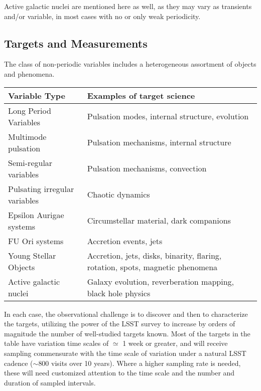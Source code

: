 Active galactic nuclei are mentioned here as well, as they may vary as transients and/or variable, in most cases with no or only weak periodicity.


\subsection{Targets and Measurements}
\label{sec:\secname:targets}

The class of non-periodic variables includes a heterogeneous
assortment of objects and phenomena.

\begin{center}
\begin{tabular}{| p{5cm} | p{10cm} |}
\hline Variable Type & Examples of target science\\
\hline
Long Period Variables & Pulsation modes, internal structure, evolution\\
Multimode pulsation & Pulsation mechanisms, internal structure\\
Semi-regular variables & Pulsation mechanisms, convection \\
Pulsating irregular variables & Chaotic dynamics \\
Epsilon Aurigae systems & Circumstellar material, dark companions\\
FU Ori systems & Accretion events, jets\\
Young Stellar Objects & Accretion, jets, disks, binarity, flaring, rotation, spots, magnetic phenomena\\
Active galactic nuclei & Galaxy evolution, reverberation mapping, black hole physics\\
 \hline \end{tabular}
 \end{center}

In each case, the observational challenge is to discover and then to
characterize the targets, utilizing the power of the LSST survey to
increase by orders of magnitude the number of well-studied targets
known.  Most of the targets in the table have variation time scales of
$\simeq$ 1 week or greater, and will receive sampling commensurate
with the time scale of variation under a natural LSST cadence
($\sim$800 visits over 10 years).  Where a higher sampling rate is
needed, these will need customized attention to the time scale and the
number and duration of sampled intervals.


